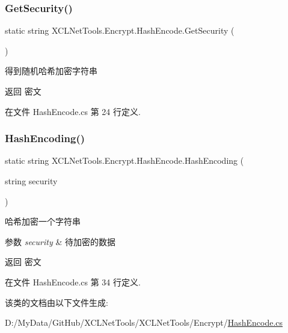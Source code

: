 \subsubsection{\texorpdfstring{Get\+Security()}{GetSecurity()}}
{\footnotesize\ttfamily static string X\+C\+L\+Net\+Tools.\+Encrypt.\+Hash\+Encode.\+Get\+Security (\begin{DoxyParamCaption}{ }\end{DoxyParamCaption})\hspace{0.3cm}{\ttfamily [static]}}



得到随机哈希加密字符串 

\begin{DoxyReturn}{返回}
密文
\end{DoxyReturn}


在文件 Hash\+Encode.\+cs 第 24 行定义.

\mbox{\label{class_x_c_l_net_tools_1_1_encrypt_1_1_hash_encode_a274d0413fc6c3ce6ba24300fab20fee8}} 
\subsubsection{\texorpdfstring{Hash\+Encoding()}{HashEncoding()}}
{\footnotesize\ttfamily static string X\+C\+L\+Net\+Tools.\+Encrypt.\+Hash\+Encode.\+Hash\+Encoding (\begin{DoxyParamCaption}\item[{string}]{security }\end{DoxyParamCaption})\hspace{0.3cm}{\ttfamily [static]}}



哈希加密一个字符串 


\begin{DoxyParams}{参数}
{\em security} & 待加密的数据\\
\hline
\end{DoxyParams}
\begin{DoxyReturn}{返回}
密文
\end{DoxyReturn}


在文件 Hash\+Encode.\+cs 第 34 行定义.



该类的文档由以下文件生成\+:\begin{DoxyCompactItemize}
\item 
D\+:/\+My\+Data/\+Git\+Hub/\+X\+C\+L\+Net\+Tools/\+X\+C\+L\+Net\+Tools/\+Encrypt/\hyperlink{_hash_encode_8cs}{Hash\+Encode.\+cs}\end{DoxyCompactItemize}

